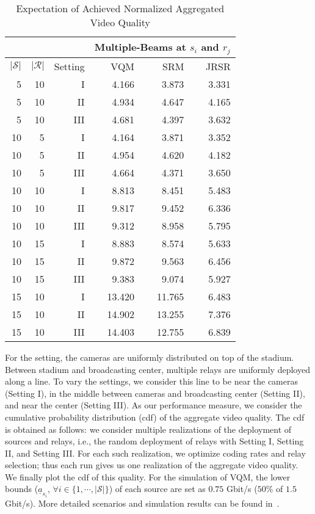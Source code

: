 \documentclass[conference]{IEEEtran}
\begin{document}
\begin{table}[tp]\caption{Expectation of Achieved Normalized Aggregated Video Quality}
\label{expectation}
\centering \begin{tabular}{r|r|r||r|r|r}
\hline
\multicolumn{3}{c||}{}&\multicolumn{3}{c}{Multiple-Beams at $s_{i}$ and $r_{j}$} \\
\hline
$|\mathcal{S}|$ & $|\mathcal{R}|$ & Setting & \textsf{VQM} & \textsf{SRM} & \textsf{JRSR}\\
\hline
\hline
5 & 10 &   I & 4.166 & 3.873 & 3.331 \\
5 & 10 &  II & 4.934 & 4.647 & 4.165 \\
5 & 10 & III & 4.681 & 4.397 & 3.632 \\
\hline
10 & 5 &   I & 4.164 & 3.871 & 3.352 \\
10 & 5 &  II & 4.954 & 4.620 & 4.182 \\
10 & 5 & III & 4.664 & 4.371 & 3.650 \\
\hline
10 & 10 &   I & 8.813 & 8.451 & 5.483 \\
10 & 10 &  II & 9.817 & 9.452 & 6.336 \\
10 & 10 & III & 9.312 & 8.958 & 5.795 \\
\hline
10 & 15 &   I & 8.883 & 8.574 & 5.633 \\
10 & 15 &  II & 9.872 & 9.563 & 6.456 \\
10 & 15 & III & 9.383 & 9.074 & 5.927 \\
\hline
15 & 10 &   I & 13.420 & 11.765 & 6.483 \\
15 & 10 &  II & 14.902 & 13.255 & 7.376 \\
15 & 10 & III & 14.403 & 12.755 & 6.839 \\
\hline
\end{tabular}
\end{table}


For the setting, the cameras are uniformly distributed on top of the stadium. Between stadium and broadcasting center, multiple relays are uniformly deployed along a line. To vary the settings, we consider this line to be near the cameras (Setting I), in the middle between cameras and broadcasting center (Setting II), and near the center (Setting III).
As our performance measure, we consider the cumulative probability distribution (cdf) of the aggregate video quality.
The cdf is obtained as follows: we consider multiple realizations of the deployment of sources and relays, i.e., the random deployment of relays with Setting I, Setting II, and Setting III.
For each such realization, we optimize coding rates and relay selection; thus each run gives us one realization of the aggregate video quality. We finally plot the cdf of this quality. For the simulation of \textsf{VQM}, the lower bounds ($\underline{a}_{s_{i}}$, $\forall i\in\{1,\cdots,|\mathcal{S}|\}$) of each source are set as $0.75$ Gbit/s ($50\%$ of $1.5$ Gbit/s).
More detailed scenarios and simulation results can be found in~\cite{kim12tbc}.
\end{document}
